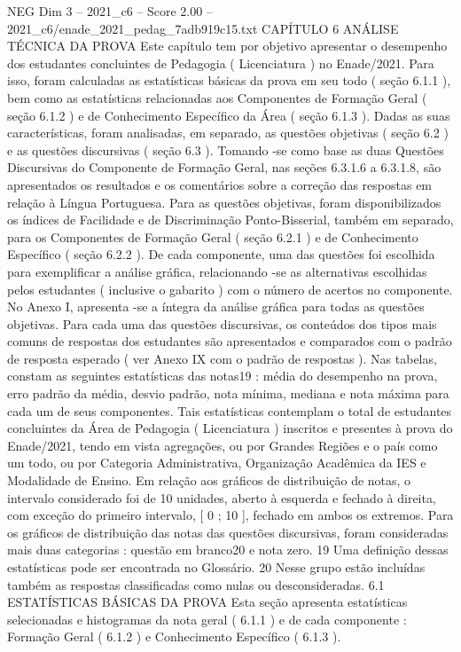 \begin{textsample}{NEG Dim 3 – 2021\_c6 – Score 2.00 – 2021\_c6/enade\_2021\_pedag\_7adb919c15.txt}  \label{ex:f3_neg_238}
CAPÍTULO 6 ANÁLISE TÉCNICA DA PROVA Este capítulo tem por objetivo apresentar o desempenho dos estudantes concluintes de Pedagogia ( Licenciatura ) no Enade/2021.
Para isso, foram calculadas as estatísticas básicas da prova em seu todo ( seção 6.1.1 ), bem como as estatísticas relacionadas aos Componentes de Formação Geral ( seção 6.1.2 ) e de Conhecimento Específico da Área ( seção 6.1.3 ).
Dadas as suas características, foram analisadas, em separado, as questões objetivas ( seção 6.2 ) e as questões discursivas ( seção 6.3 ).
Tomando -se como base as duas Questões Discursivas do Componente de Formação Geral, nas seções 6.3.1.6 a 6.3.1.8, são apresentados os resultados e os comentários sobre a correção das respostas em relação à Língua Portuguesa.
Para as questões objetivas, foram disponibilizados os índices de Facilidade e de Discriminação Ponto-Bisserial, também em separado, para os Componentes de Formação Geral ( seção 6.2.1 ) e de Conhecimento Específico ( seção 6.2.2 ).
De cada componente, uma das questões foi escolhida para exemplificar a análise gráfica, relacionando -se as alternativas escolhidas pelos estudantes ( inclusive o gabarito ) com o número de acertos no componente.
No Anexo I, apresenta -se a íntegra da análise gráfica para todas as questões objetivas.
Para cada uma das questões discursivas, os conteúdos dos tipos mais comuns de respostas dos estudantes são apresentados e comparados com o padrão de resposta esperado ( ver Anexo IX com o padrão de respostas ).
Nas tabelas, constam as seguintes estatísticas das notas19 : média do desempenho na prova, erro padrão da média, desvio padrão, nota mínima, mediana e nota máxima para cada um de seus componentes.
Tais estatísticas contemplam o total de estudantes concluintes da Área de Pedagogia ( Licenciatura ) inscritos e presentes à prova do Enade/2021, tendo em vista agregações, ou por Grandes Regiões e o país como um todo, ou por Categoria Administrativa, Organização Acadêmica da IES e Modalidade de Ensino.
Em relação aos gráficos de distribuição de notas, o intervalo considerado foi de 10 unidades, aberto à esquerda e fechado à direita, com exceção do primeiro intervalo, [ 0 ; 10 ], fechado em ambos os extremos.
Para os gráficos de distribuição das notas das questões discursivas, foram consideradas mais duas categorias : questão em branco20 e nota zero. 19 Uma definição dessas estatísticas pode ser encontrada no Glossário. 20 Nesse grupo estão incluídas também as respostas classificadas como nulas ou desconsideradas. 6.1 ESTATÍSTICAS BÁSICAS DA PROVA Esta seção apresenta estatísticas selecionadas e histogramas da nota geral ( 6.1.1 ) e de cada componente : Formação Geral ( 6.1.2 ) e Conhecimento Específico ( 6.1.3 ).

\end{textsample}
